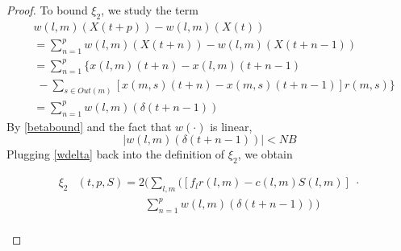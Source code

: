 \begin{proof}
%
To bound $\xi_2$, we study the term
\begin{align} \nonumber
&w(l,m)(X(t+p))   -  w(l,m)(X(t)) \\ \nonumber
& = \sum_{n=1}^{p} w(l,m)(X(t+n)) - w(l,m)(X(t + n - 1)) \\ \nonumber
&= \sum_{n=1}^{p} \Big\{ x(l,m)(t + n) - x(l,m)(t + n - 1)   \\ \nonumber 
&  \; - \sum_{s \in Out(m)}[ x(m,s)(t + n) - x(m,s)(t + n - 1) ]r(m,s)  \Big\} \\ 
&= \sum_{n=1}^{p}  w(l,m)( \delta(t + n - 1)) 
\end{align}
By \eqref{betabound} and the fact that $w(\cdot)$ is linear,  
\begin{equation} \label{wdelta}
\vert w(l,m)(\delta(t + n -1)) \vert <NB
\end{equation}
Plugging \eqref{wdelta} back into the definition of $\xi_2$, we obtain
\begin{small}
\begin{align} \nonumber 
\xi_2&(t,p,S) = 2\bigg( \sum_{l,m}\big([f_{l}r(l,m) - c(l,m)S(l,m)] \; \cdot \\  \nonumber
&\qquad \qquad \qquad  \sum_{n=1}^{p}  w(l,m)( \delta(t + n - 1))\bigg)  \\ \nonumber

\end{align}
\end{small}
\end{proof}
